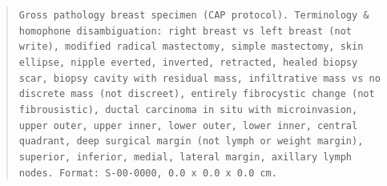 \begin{quote}
\small
\texttt{Gross pathology breast specimen (CAP protocol). Terminology \& homophone disambiguation: right breast vs left breast (not write), modified radical mastectomy, simple mastectomy, skin ellipse, nipple everted, inverted, retracted, healed biopsy scar, biopsy cavity with residual mass, infiltrative mass vs no discrete mass (not discreet), entirely fibrocystic change (not fibrousistic), ductal carcinoma in situ with microinvasion, upper outer, upper inner, lower outer, lower inner, central quadrant, deep surgical margin (not lymph or weight margin), superior, inferior, medial, lateral margin, axillary lymph nodes. Format: S-00-0000, 0.0 x 0.0 x 0.0 cm.}
\end{quote}

